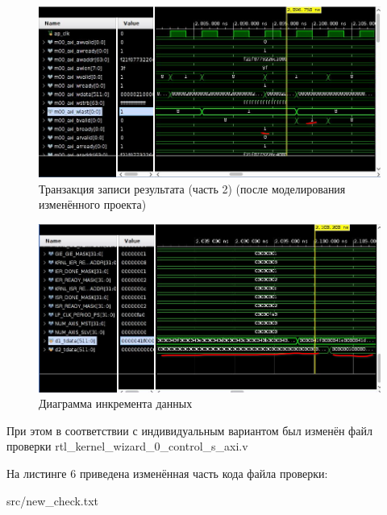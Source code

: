 \FloatBarrier
\begin{figure}[h]
	\begin{center}
		\includegraphics[width=\linewidth]{inc/write_my_2.png}
	\end{center}
	\caption{Транзакция записи результата (часть 2) (после моделирования изменённого проекта)}
\end{figure}
\FloatBarrier

\FloatBarrier
\begin{figure}[h]
	\begin{center}
		\includegraphics[width=\linewidth]{inc/inc_my.png}
	\end{center}
	\caption{Диаграмма инкремента данных}
\end{figure}
\FloatBarrier

При этом в соответствии с индивидуальным вариантом был изменён файл проверки rtl\_kernel\_wizard\_0\_control\_s\_axi.v

На листинге 6 приведена изменённая часть кода файла проверки:
\begin{lstinputlisting}[caption=Изменённый код *adder.v, 
	basicstyle=\footnotesize\ttfamily, frame=single,breaklines=true]{src/new_check.txt}
\end{lstinputlisting}

